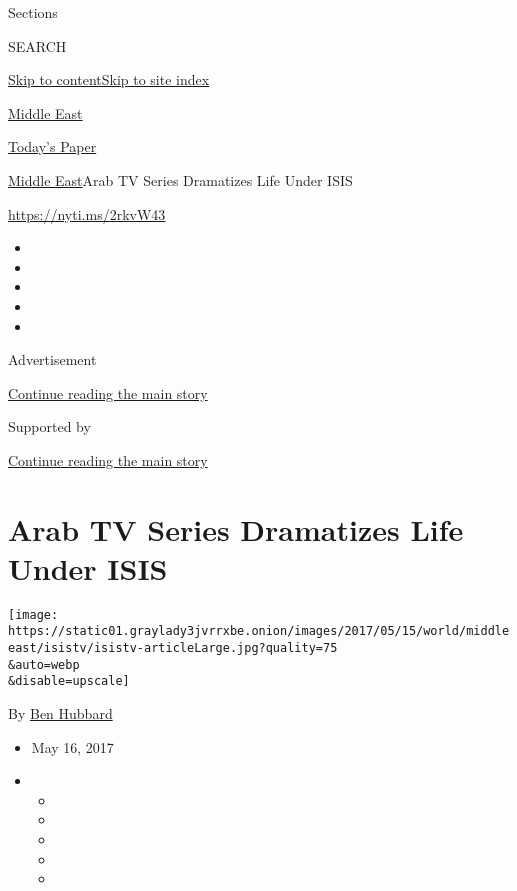 Sections

SEARCH

\protect\hyperlink{site-content}{Skip to
content}\protect\hyperlink{site-index}{Skip to site index}

\href{https://www.nytimes3xbfgragh.onion/section/world/middleeast}{Middle
East}

\href{https://myaccount.nytimes3xbfgragh.onion/auth/login?response_type=cookie\&client_id=vi}{}

\href{https://www.nytimes3xbfgragh.onion/section/todayspaper}{Today's
Paper}

\href{/section/world/middleeast}{Middle East}\textbar{}Arab TV Series
Dramatizes Life Under ISIS

\url{https://nyti.ms/2rkvW43}

\begin{itemize}
\item
\item
\item
\item
\item
\end{itemize}

Advertisement

\protect\hyperlink{after-top}{Continue reading the main story}

Supported by

\protect\hyperlink{after-sponsor}{Continue reading the main story}

\hypertarget{arab-tv-series-dramatizes-life-under-isis}{%
\section{Arab TV Series Dramatizes Life Under
ISIS}\label{arab-tv-series-dramatizes-life-under-isis}}

\texttt{[image: https://static01.graylady3jvrrxbe.onion/images/2017/05/15/world/middleeast/isistv/isistv-articleLarge.jpg?quality=75\\\&auto=webp\\\&disable=upscale]}

By \href{http://www.nytimes3xbfgragh.onion/by/ben-hubbard}{Ben Hubbard}

\begin{itemize}
\item
  May 16, 2017
\item
  \begin{itemize}
  \item
  \item
  \item
  \item
  \item
  \end{itemize}
\end{itemize}

